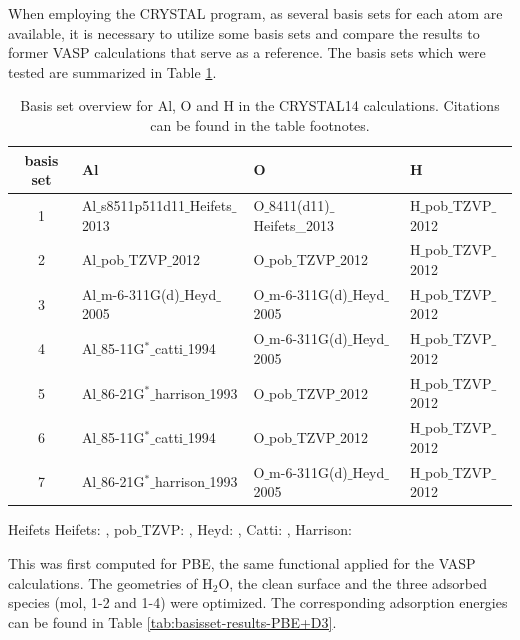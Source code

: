 \documentclass[11pt,DIV=13,BCOR=5mm,a4paper,headinclude]{scrbook}
\begin{document}
When employing the CRYSTAL program, as several basis sets for each atom are available, it is necessary to utilize some basis sets and compare the results to former VASP calculations that serve as a reference.
The basis sets which were tested are summarized in Table \ref{tab:basissets}.
\begin{table}[!h]
  \centering
   \caption{Basis set overview for Al, O and H in the CRYSTAL14 calculations. Citations can be found in the table footnotes.}
  \begin{tabular}{c|lll}
  \toprule
  basis set & Al & O & H \\\midrule
   1&Al$\_$s8511p511d11$\_$Heifets$\_$2013 & O$\_$8411(d11)$\_$Heifets\_2013&H$\_$pob$\_$TZVP$\_$2012 \\
   2&Al$\_$pob$\_$TZVP$\_$2012 &O$\_$pob$\_$TZVP$\_$2012 & H$\_$pob$\_$TZVP$\_$2012\\
   3&Al$\_$m-6-311G(d)$\_$Heyd$\_$2005 &O$\_$m-6-311G(d)$\_$Heyd$\_$2005 & H$\_$pob$\_$TZVP$\_$2012\\
   4&Al$\_$85-11G$^\ast\_$catti$\_$1994 &O$\_$m-6-311G(d)$\_$Heyd$\_$2005 & H$\_$pob$\_$TZVP$\_$2012\\
   5&Al$\_$86-21G$^\ast\_$harrison$\_$1993 &O$\_$pob$\_$TZVP$\_$2012 & H$\_$pob$\_$TZVP$\_$2012\\
   6&Al$\_$85-11G$^\ast\_$catti$\_$1994 &O$\_$pob$\_$TZVP$\_$2012 & H$\_$pob$\_$TZVP$\_$2012\\
   7&Al$\_$86-21G$^\ast\_$harrison$\_$1993 &O$\_$m-6-311G(d)$\_$Heyd$\_$2005 & H$\_$pob$\_$TZVP$\_$2012\\\bottomrule
  \end{tabular}
  \begin{tablenotes}
 \footnotesize
\item[Heifets] Heifets: \cite{heifets}, pob$\_$TZVP: \cite{pobTZVP}, Heyd: \cite{heyd1,heyd2}, Catti: \cite{catti}, Harrison: \cite{harrison1,harrison2}
\end{tablenotes}
  \label{tab:basissets}
\end{table}
This was first computed for PBE, the same functional applied for the VASP calculations.
The geometries of H$_2$O, the clean surface and the three adsorbed species (mol, 1-2 and 1-4) were optimized.
The corresponding adsorption energies can be found in Table \ref{tab:basisset-results-PBE+D3}.
\end{document}
